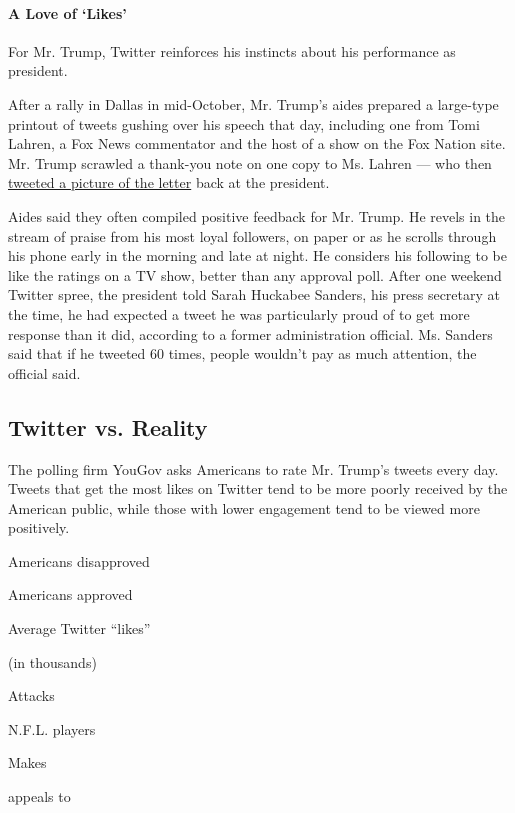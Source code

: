\hypertarget{a-love-of-likes}{%
\paragraph{A Love of `Likes'}\label{a-love-of-likes}}

For Mr. Trump, Twitter reinforces his instincts about his performance as
president.

After a rally in Dallas in mid-October, Mr. Trump's aides prepared a
large-type printout of tweets gushing over his speech that day,
including one from Tomi Lahren, a Fox News commentator and the host of a
show on the Fox Nation site. Mr. Trump scrawled a thank-you note on one
copy to Ms. Lahren --- who then
\href{https://twitter.com/TomiLahren/status/1187105545997602816?s=20}{tweeted
a picture of the letter} back at the president.

Aides said they often compiled positive feedback for Mr. Trump. He
revels in the stream of praise from his most loyal followers, on paper
or as he scrolls through his phone early in the morning and late at
night. He considers his following to be like the ratings on a TV show,
better than any approval poll. After one weekend Twitter spree, the
president told Sarah Huckabee Sanders, his press secretary at the time,
he had expected a tweet he was particularly proud of to get more
response than it did, according to a former administration official. Ms.
Sanders said that if he tweeted 60 times, people wouldn't pay as much
attention, the official said.

\hypertarget{twitter-vs-reality}{%
\subsection{Twitter vs. Reality}\label{twitter-vs-reality}}

The polling firm YouGov asks Americans to rate Mr. Trump's tweets every
day. Tweets that get the most likes on Twitter tend to be more poorly
received by the American public, while those with lower engagement tend
to be viewed more positively.

Americans disapproved

Americans approved

Average Twitter ``likes''

(in thousands)

Attacks

N.F.L. players

Makes

appeals to

